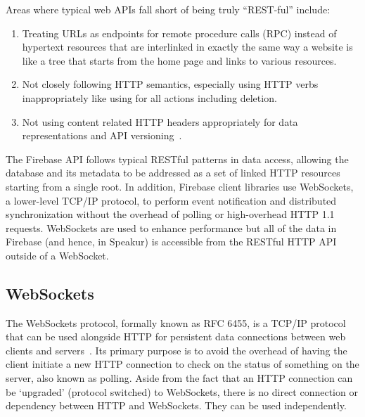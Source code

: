 Areas where typical web APIs fall short of being truly ``REST-ful'' include:
\begin{enumerate}
\item Treating URLs as endpoints for remote procedure calls (RPC) instead of hypertext resources that are interlinked in exactly the same way a website is like a tree that starts from the home page and links to various resources.
\item Not closely following HTTP semantics, especially using HTTP verbs inappropriately like using  for all actions including deletion.
\item Not using content related HTTP headers appropriately for data representations and API versioning~\cite{steveklabnik2011}.
\end{enumerate}

The Firebase API follows typical RESTful patterns in data access, allowing the database 
and its metadata to be addressed as a set of linked HTTP resources starting from a single root.
In addition, Firebase client libraries use WebSockets, 
a lower-level TCP/IP protocol, 
to perform event notification and distributed synchronization without the overhead of polling or high-overhead HTTP 1.1 requests.
WebSockets are used to enhance performance but all of the data in Firebase 
(and hence, in Speakur) 
is accessible from the RESTful HTTP API outside of a WebSocket.

\subsection{WebSockets}
\label{sec:websockets}
The WebSockets protocol, formally known as RFC 6455, 
is a TCP/IP protocol that can be used alongside HTTP for persistent data connections between web clients and servers~\cite{mozillacontributors2015-a}.
Its primary purpose is to avoid the overhead of having the client initiate a new HTTP connection to check on the status of something on the server, also known as polling.
Aside from the fact that an HTTP connection can be `upgraded' (protocol switched) to WebSockets,
there is no direct connection or dependency between HTTP and WebSockets.
They can be used independently.

